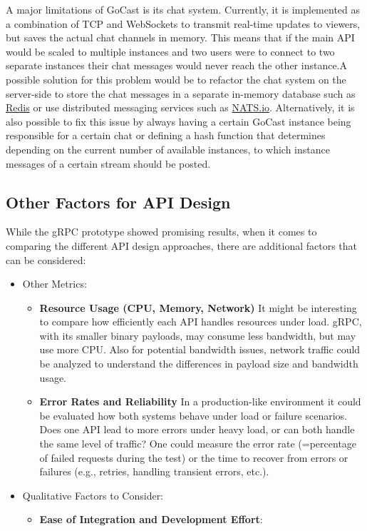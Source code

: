 A major limitations of GoCast is its chat system. Currently, it is implemented as a combination of TCP and WebSockets to transmit real-time updates to viewers, but saves the actual chat channels in memory. This means that if the main API would be scaled to multiple instances and two users were to connect to two separate instances their chat messages would never reach the other instance.A possible solution for this problem would be to refactor the chat system on the server-side to store the chat messages in a separate in-memory database such as \href{https://redis.io/}{Redis} or use distributed messaging services such as \href{https://github.com/nats-io/nats-server}{NATS.io}. Alternatively, it is also possible to fix this issue by always having a certain GoCast instance being responsible for a certain chat or defining a hash function that determines depending on the current number of available instances, to which instance messages of a certain stream should be posted. 

\subsection{Other Factors for API Design}

While the gRPC prototype showed promising results, when it comes to comparing the different API design approaches, there are additional factors that can be considered:

\begin{itemize}
    \item Other Metrics:
    \begin{itemize} 
        \item \textbf{Resource Usage (CPU, Memory, Network)}
        It might be interesting to compare how efficiently each API handles resources under load. gRPC, with its smaller binary payloads, may consume less bandwidth, but may use more CPU. 
        Also for potential bandwidth issues, network traffic could be analyzed to understand the differences in payload size and bandwidth usage.
        
        \item \textbf{Error Rates and Reliability}
        In a production-like environment it could be evaluated how both systems behave under load or failure scenarios. Does one API lead to more errors under heavy load, or can both handle the same level of traffic? One could measure the error rate (=percentage of failed requests during the test) or the time to recover from errors or failures (e.g., retries, handling transient errors, etc.).
    \end{itemize}
   
    \item Qualitative Factors to Consider:
    \begin{itemize}
        \item \textbf{Ease of Integration and Development Effort}: 
            \end{itemize}
\end{itemize}

